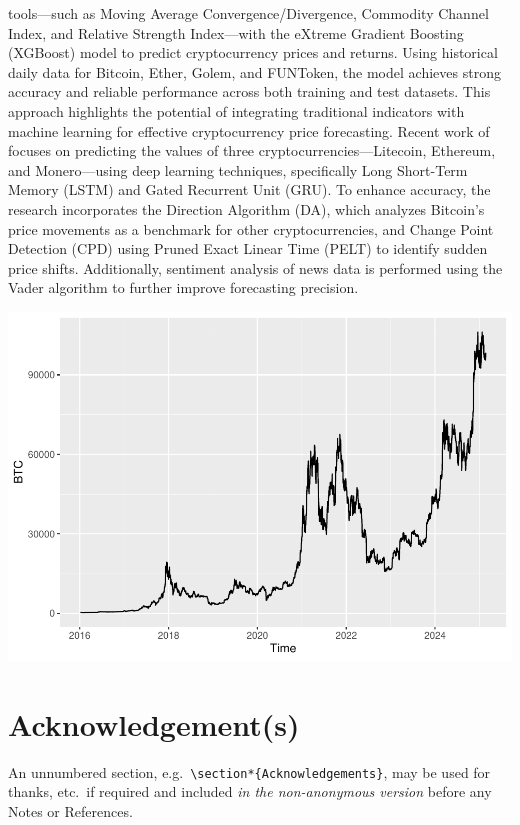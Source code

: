 \documentclass[]{interact}
\theoremstyle{plain}%
\theoremstyle{definition}
\theoremstyle{remark}
\begin{document}
tools---such as Moving Average Convergence/Divergence, Commodity Channel
Index, and Relative Strength Index---with the eXtreme Gradient Boosting
(XGBoost) model to predict cryptocurrency prices and returns. Using
historical daily data for Bitcoin, Ether, Golem, and FUNToken, the model
achieves strong accuracy and reliable performance across both training
and test datasets. This approach highlights the potential of integrating
traditional indicators with machine learning for effective
cryptocurrency price forecasting. Recent work of \citep{shirwaikar2025}
focuses on predicting the values of three cryptocurrencies---Litecoin,
Ethereum, and Monero---using deep learning techniques, specifically Long
Short-Term Memory (LSTM) and Gated Recurrent Unit (GRU). To enhance
accuracy, the research incorporates the Direction Algorithm (DA), which
analyzes Bitcoin's price movements as a benchmark for other
cryptocurrencies, and Change Point Detection (CPD) using Pruned Exact
Linear Time (PELT) to identify sudden price shifts. Additionally,
sentiment analysis of news data is performed using the Vader algorithm
to further improve forecasting precision.

\begin{center}\includegraphics[width=0.85\linewidth]{Colloque_files/figure-latex/unnamed-chunk-2-1} \end{center}

\section*{Acknowledgement(s)}\label{acknowledgements}

An unnumbered section,
e.g.~\texttt{\textbackslash{}section*\{Acknowledgements\}}, may be used
for thanks, etc.~if required and included \emph{in the non-anonymous
version} before any Notes or References.
\end{document}
